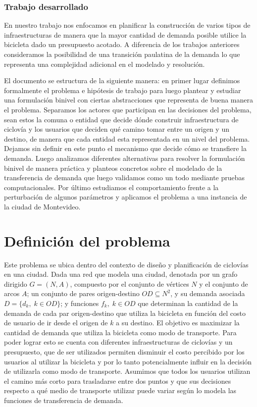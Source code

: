 \documentclass{article}
\begin{document}
  \subsubsection{Trabajo desarrollado}

  En nuestro trabajo nos enfocamos en planificar la construcción de varios tipos de infraestructuras de manera que la mayor cantidad de demanda posible utilice la bicicleta dado un presupuesto acotado. A diferencia de los trabajos anteriores consideramos la posibilidad de una transición paulatina de la demanda lo que representa una complejidad adicional en el modelado y resolución.

  El documento se estructura de la siguiente manera: en primer lugar definimos formalmente el problema e hipótesis de trabajo para luego plantear y estudiar una formulación binivel con ciertas abstracciones que representa de buena manera el problema. Separamos los actores que participan en las decisiones del problema, sean estos la comuna o entidad que decide dónde construir infraestructura de ciclovía y los usuarios que deciden qué camino tomar entre un origen y un destino, de manera que cada entidad esta representada en un nivel del problema. Dejamos sin definir en este punto el mecanismo que decide cómo se transfiere la demanda. Luego analizamos diferentes alternativas para resolver la formulación binivel de manera práctica y planteos concretos sobre el modelado de la transferencia de demanda que luego validamos como un todo mediante pruebas computacionales. Por último estudiamos el comportamiento frente a la perturbación de algunos parámetros y aplicamos el problema a una instancia de la ciudad de Montevideo.

  \section{Definición del problema}

  Este problema se ubica dentro del contexto de diseño y planificación de ciclovías en una ciudad. Dada una red que modela una ciudad, denotada por un grafo dirigido $G=(N,A)$, compuesto por el conjunto de vértices $N$ y el conjunto de arcos $A$; un conjunto de pares origen-destino $OD \subseteq N^2$, y su demanda asociada $D = \{d_k,\; k \in OD\}$; y funciones $f_k,\;k \in OD$ que determinan la cantidad de la demanda de cada par origen-destino que utiliza la bicicleta en función del costo de usuario de ir desde el origen de $k$ a su destino. El objetivo es maximizar la cantidad de demanda que utiliza la bicicleta como modo de transporte. Para poder lograr esto se cuenta con diferentes infraestructuras de ciclovías y un presupuesto, que de ser utilizados permiten disminuir el costo percibido por los usuarios al utilizar la bicicleta y por lo tanto potencialmente influir en la decisión de utilizarla como modo de transporte. Asumimos que todos los usuarios utilizan el camino más corto para trasladarse entre dos puntos y que sus decisiones respecto a qué medio de transporte utilizar puede variar según lo modela las funciones de transferencia de demanda.
\end{document}
